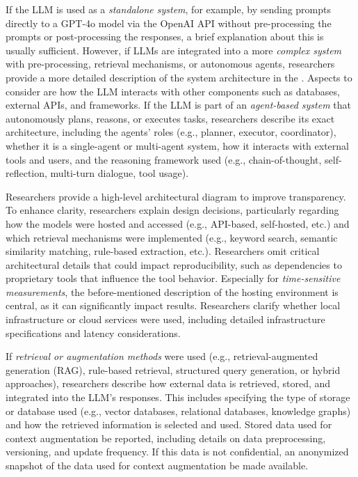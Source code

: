 If the LLM is used as a \emph{standalone system}, for example, by sending prompts directly to a GPT-4o model via the OpenAI API without pre-processing the prompts or post-processing the responses, a brief explanation about this is usually sufficient.
However, if LLMs are integrated into a more \emph{complex system} with pre-processing, retrieval mechanisms, or autonomous agents, researchers \must provide a more detailed description of the system architecture in the \paper.
Aspects to consider are how the LLM interacts with other components such as databases, external APIs, and frameworks.
If the LLM is part of an \emph{agent-based system} that autonomously plans, reasons, or executes tasks, researchers \must describe its exact architecture, including the agents' roles (e.g., planner, executor, coordinator), whether it is a single-agent or multi-agent system, how it interacts with external tools and users, and the reasoning framework used (e.g., chain-of-thought, self-reflection, multi-turn dialogue, tool usage).

Researchers \should provide a high-level architectural diagram to improve transparency.
To enhance clarity, researchers \should explain design decisions, particularly regarding how the models were hosted and accessed (e.g., API-based, self-hosted, etc.) and which retrieval mechanisms were implemented (e.g., keyword search, semantic similarity matching, rule-based extraction, etc.).
Researchers \mustnot omit critical architectural details that could impact reproducibility, such as dependencies to proprietary tools that influence the tool behavior. 
Especially for \emph{time-sensitive measurements}, the before-mentioned description of the hosting environment is central, as it can significantly impact results.
Researchers \must clarify whether local infrastructure or cloud services were used, including detailed infrastructure specifications and latency considerations.

If \emph{retrieval or augmentation methods} were used (e.g., retrieval-augmented generation (RAG), rule-based retrieval, structured query generation, or hybrid approaches), researchers \must describe how external data is retrieved, stored, and integrated into the LLM's responses.
This includes specifying the type of storage or database used (e.g., vector databases, relational databases, knowledge graphs) and how the retrieved information is selected and used.
Stored data used for context augmentation \must be reported, including details on data preprocessing, versioning, and update frequency.
If this data is not confidential, an anonymized snapshot of the data used for context augmentation \should be made available.

